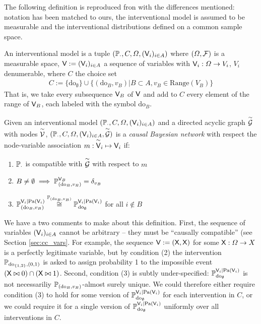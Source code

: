 The following definition is reproduced fron \citet{pearl_causality:_2009} with the differences mentioned: notation has been matched to ours, the interventional model is assumed to be measurable and the interventional distributions defined on a common sample space.

\begin{definition}\label{def:interventional}
An interventional model is a tuple $(\mathbb{P}_\cdot,C,\Omega,(\mathsf{V}_i)_{i\in A})$ where $(\Omega,\mathcal{F})$ is a measurable space,  $\mathsf{V}:=(\mathsf{V}_i)_{i\in A}$ a sequence of variables with $\mathsf{V}_i:\Omega\to V_i$, $V_i$ denumerable, where $C$ the choice set
\begin{align}
    C:=\{\mathrm{do}_{\emptyset}\}\cup \{(\mathrm{do}_B,v_B)|B\subset A,v_B\in \mathrm{Range}(V_B)\}
\end{align}
That is, we take every subsequence $\mathsf{V}_B$ of $\mathsf{V}$ and add to $C$ every element of the range of $\mathsf{V}_B$, each labeled with the symbol $\mathrm{do}_B$.
\end{definition}

\begin{definition}\label{def:CBN}
Given an interventional model $(\mathbb{P}_\cdot,C,\Omega,(\mathsf{V}_i)_{i\in A})$ and a directed acyclic graph $\overset{\sim}{\mathcal{G}}$ with nodes $\overset{\sim}{\mathcal{V}}$, $(\mathbb{P}_\cdot,C,\Omega,(\mathsf{V}_i)_{i\in A},\overset{\sim}{\mathcal{G}})$  is a \emph{causal Bayesian network} with respect the node-variable association $m:\overset{\sim}{\mathsf{V}}_i\mapsto \mathsf{V}_i$ if:
\begin{enumerate}
    \item $\mathbb{P}_\cdot$ is compatible with $\overset{\sim}{\mathcal{G}}$ with respect to $m$
    \item $B\neq \emptyset \implies \mathbb{P}_{(\mathrm{do}_{B},v_B)}^{\mathsf{V}_B} = \delta_{v_B}$
    \item $\mathbb{P}_{(\mathrm{do}_{B},v_B)}^{\mathsf{V}_i|\mathrm{Pa}(\mathsf{V}_i)}\overset{\mathbb{P}_{(\mathrm{do}_{B},v_B)}}{\cong}\mathbb{P}_{\mathrm{do}_{\emptyset}}^{\mathsf{V}_i|\mathrm{Pa}(\mathsf{V}_i)}$ for all $i\not\in B$
\end{enumerate}
\end{definition}

We have a two comments to make about this definition. First, the sequence of variables $(\mathsf{V}_i)_{i\in A}$ cannot be arbitrary -- they must be ``causally compatible'' (see Section \ref{sec:cc_vars}. For example, the sequence $\mathsf{V}:=(\mathsf{X},\mathsf{X})$ for some $\mathsf{X}:\Omega\to X$ is a perfectly legitimate variable, but by condition (2) the intervention $\mathbb{P}_{\mathrm{do}_{\{1,2\}},(0,1)}$ is asked to assign probability 1 to the impossible event $(\mathsf{X}\bowtie 0)\cap (\mathsf{X}\bowtie 1)$. Second, condition (3) is subtly under-specified: $\mathbb{P}_{\mathrm{do}_{\emptyset}}^{\mathsf{V}_i|\mathrm{Pa}(\mathsf{V}_i)}$ is not necessariliy $\mathbb{P}_{(\mathrm{do}_{B},v_B)}$-almost surely unique. We could therefore either require condition (3) to hold for some version of $\mathbb{P}_{\mathrm{do}_{\emptyset}}^{\mathsf{V}_i|\mathrm{Pa}(\mathsf{V}_i)}$ for each intervention in $C$, or we could require it for a single version of $\mathbb{P}_{\mathrm{do}_{\emptyset}}^{\mathsf{V}_i|\mathrm{Pa}(\mathsf{V}_i)}$ uniformly over all interventions in $C$.

